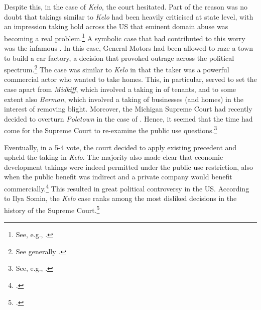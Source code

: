 Despite this, in the case of {\it Kelo}, the court hesitated. Part of the reason was no doubt that takings similar to {\it Kelo} had been heavily criticised at state level, with an impression taking hold across the US that eminent domain abuse was becoming a real problem.\footnote{See, e.g., \cite[667-669]{sandefur05}.} A symbolic case that had contributed to this worry was the infamous \textcite{poletown81}. In this case, General Motors had been allowed to raze a town to build a car factory, a decision that provoked outrage across the political spectrum.\footnote{See generally \cite{sandefur05}.} The case was similar to {\it Kelo} in that the taker was a powerful commercial actor who wanted to take homes. This, in particular, served to set the case apart from {\it Midkiff}, which involved a taking in  of tenants, and to some extent also {\it Berman}, which involved a taking of businesses (and homes) in the interest of removing blight. Moreover, the Michigan Supreme Court had recently decided to overturn {\it Poletown} in the case of \textcite{wayne04}. Hence, it seemed that the time had come for the Supreme Court to re-examine the public use questions.\footnote{See, e.g., \cite{sandefur05,claeys04}.}

Eventually, in a 5-4 vote, the court decided to apply existing precedent and upheld the taking in {\it Kelo}. The majority also made clear that economic development takings were indeed permitted under the public use restriction, also when the public benefit was indirect and a private company would benefit commercially.\footcite[469-470]{kelo05} This resulted in great political controversy in the US. According to Ilya Somin, the {\it Kelo} case ranks among the most disliked decisions in the history of the Supreme Court.\footcite[2]{somin11} 


